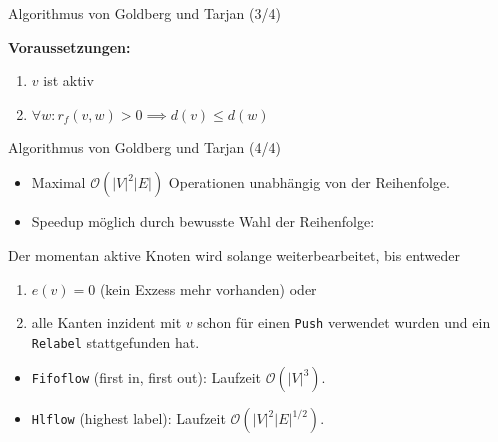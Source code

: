 \documentclass[aspectratio=169]{beamer}
\begin{document}
\begin{frame}{Algorithmus von Goldberg und Tarjan (3/4)}

  \begin{algorithmus*}
    \begin{algorithm}[H]
      \begin{algorithmic}[1]
          \EndProcedure
      \end{algorithmic}
      \textbf{Voraussetzungen:} 
        \begin{enumerate}
          \item $v$ ist aktiv
          \item $\forall w: r_f(v,w) > 0 \implies d(v) \leq d(w)$
        \end{enumerate}
    \end{algorithm}
  \end{algorithmus*}
  
\end{frame}

\begin{frame}{Algorithmus von Goldberg und Tarjan (4/4)}

  \begin{itemize}
    \item Maximal $\mathcal{O}(|V|^2|E|)$ Operationen unabhängig von der Reihenfolge.
    \item Speedup möglich durch bewusste Wahl der Reihenfolge:
  \end{itemize}
  
  Der momentan aktive Knoten wird solange weiterbearbeitet, bis entweder

  \begin{enumerate}
    \item $e(v) = 0$ (kein Exzess mehr vorhanden) oder
    \item alle Kanten inzident mit $v$ schon für einen \texttt{Push} verwendet wurden
    und ein \texttt{Relabel} stattgefunden hat. 
  \end{enumerate}

  \begin{itemize}
    \item \texttt{Fifoflow} (first in, first out): Laufzeit $\mathcal{O}(|V|^3)$.
    \item \texttt{Hlflow} (highest label): Laufzeit $\mathcal{O}(|V|^2|E|^{1/2})$.   
  \end{itemize} 
  
\end{frame}
\end{document}

